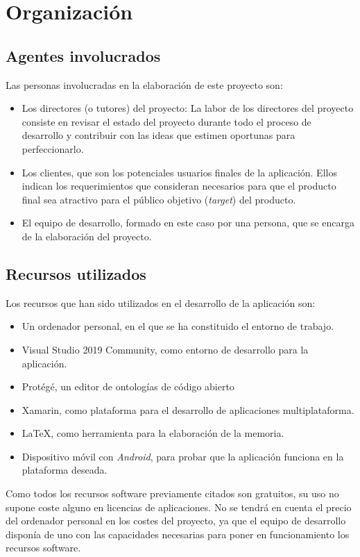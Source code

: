 
\section{Organización}

\subsection{Agentes involucrados}

Las personas involucradas en la elaboración de este proyecto son:
\begin{itemize}

    \item Los directores (o tutores) del proyecto: La labor de los directores del proyecto consiste
    en revisar el estado del proyecto durante todo el proceso de desarrollo y contribuir con las ideas 
    que estimen oportunas para perfeccionarlo. 

    \item Los clientes, que son los potenciales usuarios finales de la aplicación. Ellos indican los 
    requerimientos que consideran necesarios para que el producto final sea atractivo para el público 
    objetivo (\textit{target}) del producto.
    
    \item El equipo de desarrollo, formado en este caso por una persona, que se encarga de la 
    elaboración del proyecto.   

\end{itemize}

\subsection{Recursos utilizados}
Los recursos que han sido utilizados en el desarrollo de la aplicación son:
\begin{itemize}
    \item Un ordenador personal, en el que se ha constituido el entorno de trabajo.
    \item Visual Studio 2019 Community, como entorno de desarrollo para la aplicación.
    \item Protégé, un editor de ontologías de código abierto
    \item Xamarin, como plataforma para el desarrollo de aplicaciones multiplataforma.
    \item LaTeX, como herramienta para la elaboración de la memoria.
    \item Dispositivo móvil con \textit{Android}, para probar que la aplicación funciona en la plataforma deseada.
\end{itemize}

Como todos los recursos software previamente citados son gratuitos, su uso no supone coste 
alguno en licencias de aplicaciones. No se tendrá en cuenta el precio del ordenador personal en 
los costes del proyecto, ya que el equipo de desarrollo disponía de uno con las capacidades 
necesarias para poner en funcionamiento los recursos software.

